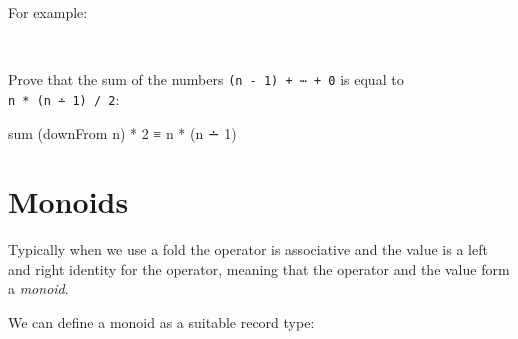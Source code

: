 For example:

\begin{fence}
\begin{code}%
\>[0]\AgdaFunction{\AgdaUnderscore{}}\AgdaSpace{}%
\AgdaSymbol{:}\AgdaSpace{}%
\AgdaSpace{}%
\AgdaSpace{}%
\AgdaSpace{}%
\AgdaOperator{\AgdaInductiveConstructor{[}}\AgdaSpace{}%
\AgdaSpace{}%
\AgdaOperator{\AgdaInductiveConstructor{,}}\AgdaSpace{}%
\AgdaSpace{}%
\AgdaOperator{\AgdaInductiveConstructor{,}}\AgdaSpace{}%
\AgdaSpace{}%
\AgdaOperator{\AgdaInductiveConstructor{]}}\<%
\\
\>[0]\AgdaSymbol{\AgdaUnderscore{}}\AgdaSpace{}%
\AgdaSymbol{=}\AgdaSpace{}%
\<%
\end{code}
\end{fence}

Prove that the sum of the numbers \texttt{(n\ -\ 1)\ +\ ⋯\ +\ 0} is
equal to \texttt{n\ *\ (n\ ∸\ 1)\ /\ 2}:

\begin{myDisplay}
sum (downFrom n) * 2 ≡ n * (n ∸ 1)
\end{myDisplay}

\hypertarget{monoids}{%
\section{Monoids}\label{monoids}}

Typically when we use a fold the operator is associative and the value
is a left and right identity for the operator, meaning that the operator
and the value form a \emph{monoid}.

We can define a monoid as a suitable record type:

